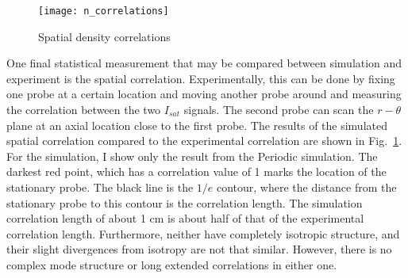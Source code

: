 \begin{figure}[!ht]
\centerline{\texttt{[image: n\_correlations]}}
\caption{Spatial density correlations}
\label{n_correlation}
\end{figure}

One final statistical measurement that may be compared between simulation and experiment is the spatial correlation. Experimentally, this can be done by fixing one probe at a certain
location and moving another probe around and measuring the correlation between the two $I_{sat}$ signals. The second probe can scan the $r-\theta$ plane at an axial location close
to the first probe. The results of the simulated spatial correlation compared to the experimental correlation are shown in Fig.~\ref{n_correlation}. For the simulation, I show only
the result from the Periodic simulation. The darkest red point, which
has a correlation value of 1 marks the location of the stationary probe. The black line is the $1/e$ contour, where the distance from the stationary probe to this contour is
the correlation length. The simulation correlation length of about 1 cm is about half of that of the experimental correlation length. Furthermore, neither have completely isotropic
structure, and their slight divergences from isotropy are not that similar. However, there is no complex mode structure or long extended correlations in either one.
